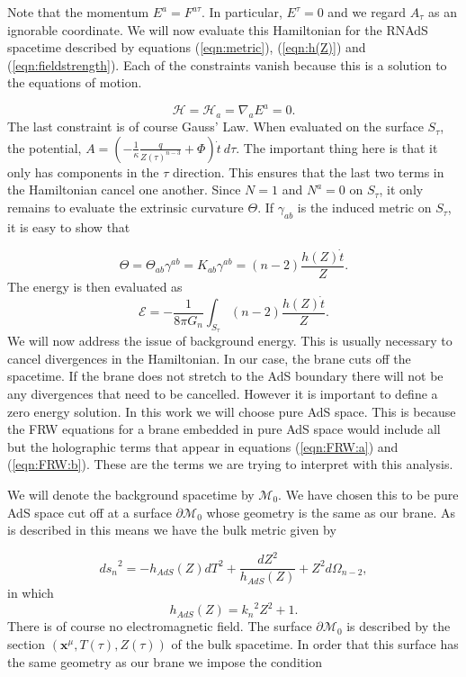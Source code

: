 \documentclass[a4paper,12pt]{article}
\begin{document}
Note that the momentum $E^a=F^{a \tau}$. In particular, $E^{\tau}=0$
and we regard $A_{\tau}$ as an ignorable coordinate. We will now
evaluate this Hamiltonian for the RNAdS spacetime described by
equations (\ref{eqn:metric}), (\ref{eqn:h(Z)}) and
(\ref{eqn:fieldstrength}). Each of the constraints vanish because this
is a solution to the equations of motion.

\begin{equation}
\mathcal{H}=\mathcal{H}_a=\nabla_a E^a=0.
\end{equation}
The last constraint is of course Gauss' Law. When evaluated on the
surface $S_{\tau}$,  the potential,
$A=\left(-\frac{1}{\kappa}\frac{q}{Z(\tau)^{n-3}} + \Phi\right)
\dot{t} \ d\tau$. The important thing here is that it  only has
components in the $\tau$ direction. This ensures that the last two
terms in the Hamiltonian cancel one another. Since $N=1$ and $N^a=0$
on $S_{\tau}$, it only remains to evaluate the extrinsic curvature
$\Theta$. If $\gamma_{ab}$ is the induced metric on $S_{\tau}$, it is
easy to show that

\begin{equation}
\Theta=\Theta_{ab} \gamma^{ab}=K_{ab} \gamma^{ab} = (n-2)\frac{h(Z)
\dot{t}}{Z}.
\end{equation}
The energy is then evaluated as
\begin{equation}
\mathcal{E}= -\frac{1}{8 \pi G_n} \int_{S_{\tau}} (n-2)\frac{h(Z)
\dot{t}}{Z}.
\end{equation}
We will now address the issue of background energy. This is usually
necessary to cancel divergences in the Hamiltonian.  In our case, the
brane cuts off the spacetime. If the brane does not stretch to the AdS
boundary there will not be any divergences that need to be
cancelled. However it is important to define a zero energy
solution. In this work we will choose pure AdS space. This is because
the FRW equations for a brane embedded in pure AdS space would include
all but the holographic terms that appear in equations
(\ref{eqn:FRW:a}) and (\ref{eqn:FRW:b}). These are the terms we are
trying to interpret with this analysis.

We will denote the background spacetime by $\mathcal{M}_0$.  We have
chosen this to be pure AdS space cut off at a surface $\partial
\mathcal{M}_0$ whose geometry is the same as our brane. As is
described in \cite{Padilla:CFT} this means we have the bulk metric
given by

\begin{equation} \label{eqn:AdSmetric}
{ds_n}^2 = -h_{AdS}(Z)dT^2 + \frac{dZ^2}{h_{AdS}(Z)} + Z^2
d\Omega_{n-2},
\end{equation}
in which
\begin{equation} \label{eqn:h_AdS(Z)}
h_{AdS}(Z) = {k_n}^2 Z^2 + 1.
\end{equation}
There is of course no electromagnetic field. The surface  $\partial
\mathcal{M}_0$ is described by the section $(\mathbf{x}^{\mu},
T(\tau), Z(\tau))$ of the bulk spacetime. In order that this surface
has the same geometry as our brane we impose the condition
\end{document}
